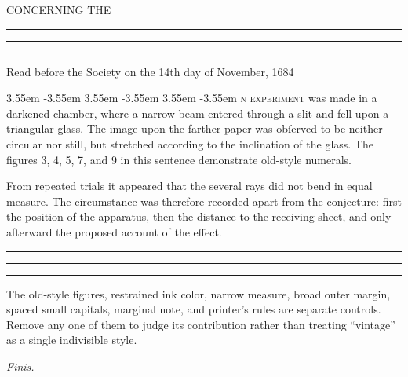 \documentclass[11pt,twoside]{article}
\newcommand{\dropcap}[2]{%
  \noindent
  \parshape 4
    3.55em \dimexpr\linewidth-3.55em\relax
    3.55em \dimexpr\linewidth-3.55em\relax
    3.55em \dimexpr\linewidth-3.55em\relax
    0pt \linewidth
  \makebox[0pt][r]{%
    \raisebox{-1.48\baselineskip}[0pt][0pt]{%
      \fontsize{47}{47}\selectfont #1}%
    \hspace{0.16em}}%
  \textsc{#2}%
}
\newcommand{\printerrule}{%
  \par\vspace{0.55em}
  \begin{center}
    \rule{0.19\linewidth}{0.35pt}\hspace{0.45em}%
    \rule{0.075\linewidth}{1.05pt}\hspace{0.45em}%
    \rule{0.19\linewidth}{0.35pt}
  \end{center}
  \vspace{0.15em}
}
\begin{document}
\begin{center}
  {\Large{}}\par
  \vspace{0.55em}
  {\small CONCERNING THE}\par
  \vspace{0.2em}
  {\large{}}\par
  \printerrule
  {\small Read before the Society on the 14th day of November, 1684}
\end{center}

\vspace{1.35em}

\dropcap{A}{n experiment} was made in a darkened chamber, where a narrow
beam entered through a slit and fell upon a triangular glass. The image upon
the farther paper was obſerved to be neither circular nor still, but stretched
according to the inclination of the glass. The figures 3, 4, 5, 7, and 9 in
this sentence demonstrate old-style numerals.


From repeated trials it appeared that the several rays did not bend in equal
measure. The circumstance was therefore recorded apart from the conjecture:
first the position of the apparatus, then the distance to the receiving sheet,
and only afterward the proposed account of the effect.

\printerrule

\begin{center}
  {\small{}}
\end{center}

The old-style figures, restrained ink color, narrow measure, broad outer
margin, spaced small capitals, marginal note, and printer's rules are separate
controls. Remove any one of them to judge its contribution rather than treating
``vintage'' as a single indivisible style.

\vfill
\begin{center}
  {\footnotesize\textit{Finis.}}
\end{center}
\end{document}

